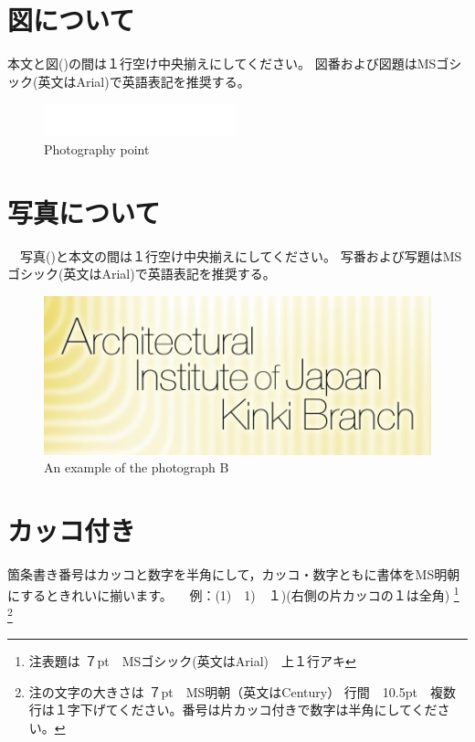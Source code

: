 \documentclass[base=11pt,magstyle=real,a4paper,twocolumn,xelatex,pandoc,jafont=ms]{bxjsarticle}
\begin{document}
\section{図について}
本文と図()の間は１行空け中央揃えにしてください。
図番および図題はMSゴシック(英文はArial)で英語表記を推奨する。
\begin{figure}[h]
	\centering
	\includegraphics[width=1\linewidth]{../figure/figure1}
	\caption{Photography point}
	\label{fig:figure1}
\end{figure}


\section{写真について}
　写真()と本文の間は１行空け中央揃えにしてください。
写番および写題はMSゴシック(英文はArial)で英語表記を推奨する。

\begin{figure}[h]
	\centering
	\includegraphics[width=1\linewidth]{../figure/photo1}
	\caption{An example of the photograph B}
	\label{fig:photo1}
\end{figure}


\section{カッコ付き}
箇条書き番号はカッコと数字を半角にして，カッコ・数字ともに書体をMS明朝にするときれいに揃います。
　例：(1)　1)　１)(右側の片カッコの１は全角)
\footnote{注表題は ７pt　MSゴシック(英文はArial)　上１行アキ}
\footnote{注の文字の大きさは ７pt　MS明朝（英文はCentury） 行間　10.5pt　複数行は１字下げてください。番号は片カッコ付きで数字は半角にしてください。}
\end{document}

